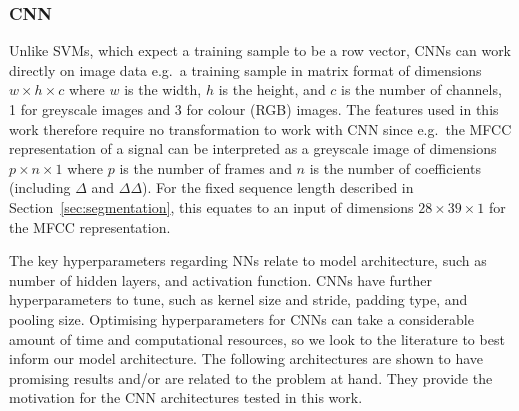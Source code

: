 \subsubsection{CNN}\label{sssec:method:cnn}

Unlike SVMs, which expect a training sample to be a row vector, CNNs can work
directly on image data e.g.\ a training sample in matrix format of dimensions
$w \times h \times c$ where $w$ is the width, $h$ is the height, and $c$ is the
number of channels, 1 for greyscale images and 3 for colour (RGB) images. The
features used in this work therefore require no transformation to work with CNN
since e.g.\ the MFCC representation of a signal can be interpreted as a
greyscale image of dimensions $p \times n \times 1$ where $p$ is the number of
frames and $n$ is the number of coefficients (including $\Delta$ and
$\Delta\Delta$). For the fixed sequence length described in
Section~\ref{sec:segmentation}, this equates to an input of dimensions $28
\times 39 \times 1$ for the MFCC representation.

The key hyperparameters regarding NNs relate to model architecture, such as
number of hidden layers, and activation function. CNNs have further
hyperparameters to tune, such as kernel size and stride, padding type, and
pooling size. Optimising hyperparameters for CNNs can take a
considerable amount of time and computational resources, so we look to the
literature to best inform our model architecture. The following architectures are
shown to have promising results and/or are related to the problem at hand. They
provide the motivation for the CNN architectures tested in this work.

